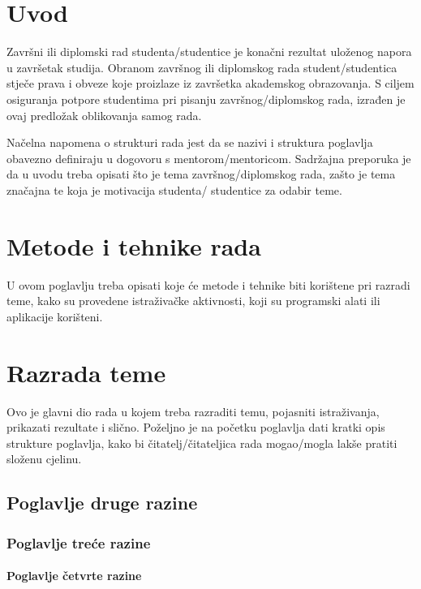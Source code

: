 \chapter{Uvod}

Završni ili diplomski rad studenta/studentice je konačni rezultat uloženog napora u završetak studija. Obranom završnog ili diplomskog rada student/studentica stječe prava i obveze koje proizlaze iz završetka akademskog obrazovanja. S ciljem osiguranja potpore studentima pri pisanju završnog/diplomskog rada, izrađen je ovaj predložak oblikovanja samog rada.

Načelna napomena o strukturi rada jest da se nazivi i struktura poglavlja obavezno definiraju u dogovoru s mentorom/mentoricom. Sadržajna preporuka je da u uvodu treba opisati što je tema završnog/diplomskog rada, zašto je tema značajna te koja je motivacija studenta/ studentice za odabir teme.

\chapter{Metode i tehnike rada}

U ovom poglavlju treba opisati koje će metode i tehnike biti korištene pri razradi teme, kako su provedene istraživačke aktivnosti, koji su programski alati ili aplikacije korišteni.

\lipsum[1-2]

\chapter{Razrada teme}

Ovo je glavni dio rada u kojem treba razraditi temu, pojasniti istraživanja, prikazati rezultate i slično. Poželjno je na početku poglavlja dati kratki opis strukture poglavlja, kako bi čitatelj/čitateljica rada mogao/mogla lakše pratiti složenu cjelinu.

\section{Poglavlje druge razine }

\lipsum[1]

\subsection{Poglavlje treće razine}

\lipsum[2]

\subsubsection{Poglavlje četvrte razine}

